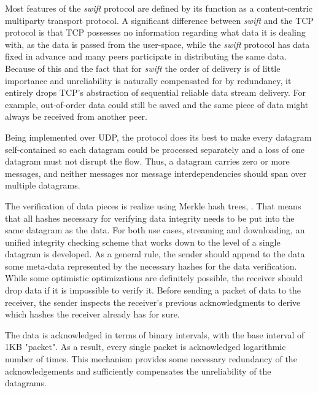 
Most features of the \emph{swift} protocol are defined by its function as a content-centric multiparty transport 
protocol. A significant difference between \emph{swift} and the TCP protocol is that TCP possesses no information
regarding what data it is dealing with, as the data is passed from the user-space, while the \emph{swift} protocol has
data fixed in advance and many peers participate in distributing the same data. Because of this and the fact that for
\emph{swift} the order of delivery is of little importance and unreliability is naturally compensated for by redundancy,
it entirely drops TCP's abstraction of sequential reliable data stream delivery. For example, out-of-order data could
still be saved and the same piece of data might always be received from another peer.

Being implemented over UDP, the protocol does its best to make every datagram self-contained so each datagram could be 
processed separately and a loss of one datagram must not disrupt the flow. Thus, a datagram carries zero or more
messages, and neither messages nor message interdependencies should span over multiple datagrams. 

The verification of data pieces is realize using Merkle hash trees\cite{merkle}, \cite{merkle-ext}. That means that all
hashes necessary for verifying data integrity needs to be put into the same datagram as the data. For both use cases,
streaming and downloading, an unified  integrity checking scheme that works down to the level of a single datagram is
developed. As a general rule, the sender should append to the data some meta-data represented by the necessary hashes
for the data verification. While some optimistic optimizations are definitely possible, the receiver should drop data if
it is impossible to verify it. Before sending a packet of data to the receiver, the sender inspects the receiver's
previous acknowledgments to derive which hashes the receiver already has for sure. 

The data is acknowledged in terms of binary intervals, with the base interval of 1KB "packet". As a result, every 
single packet is acknowledged logarithmic number of times. This mechanism provides some necessary redundancy of the
acknowledgements and sufficiently compensates the unreliability of the datagrams. 

